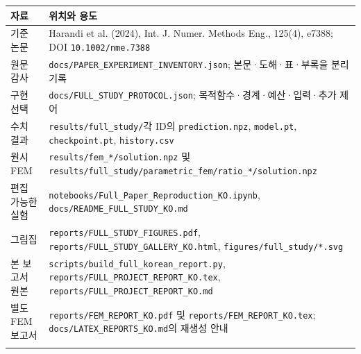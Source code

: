 \documentclass[10pt,a4paper]{article}
\begin{document}
\par\begin{minipage}{\linewidth}\begin{tabular}{>{\raggedright\arraybackslash}p{}>{\raggedright\arraybackslash}p{}}

\rowcolor{tint} \textbf{자료} & \textbf{위치와 용도}\\\midrule

기준 논문 & Harandi et al. (2024), Int. J. Numer. Methods Eng., 125(4), e7388; DOI \nolinkurl{10.1002/nme.7388}\\\addlinespace[2pt]

원문 감사 & \nolinkurl{docs/PAPER_EXPERIMENT_INVENTORY.json}; 본문·도해·표·부록을 분리 기록\\\addlinespace[2pt]

구현 선택 & \nolinkurl{docs/FULL_STUDY_PROTOCOL.json}; 목적함수·경계·예산·입력·추가 제어\\\addlinespace[2pt]

수치 결과 & \nolinkurl{results/full_study/}각 ID의 \nolinkurl{prediction.npz}, \nolinkurl{model.pt}, \nolinkurl{checkpoint.pt}, \nolinkurl{history.csv}\\\addlinespace[2pt]

원시 FEM & \nolinkurl{results/fem_*/solution.npz} 및 \nolinkurl{results/full_study/parametric_fem/ratio_*/solution.npz}\\\addlinespace[2pt]

편집 가능한 실험 & \nolinkurl{notebooks/Full_Paper_Reproduction_KO.ipynb}, \nolinkurl{docs/README_FULL_STUDY_KO.md}\\\addlinespace[2pt]

그림집 & \nolinkurl{reports/FULL_STUDY_FIGURES.pdf}, \nolinkurl{reports/FULL_STUDY_GALLERY_KO.html}, \nolinkurl{figures/full_study/*.svg}\\\addlinespace[2pt]

본 보고서 원본 & \nolinkurl{scripts/build_full_korean_report.py}, \nolinkurl{reports/FULL_PROJECT_REPORT_KO.tex}, \nolinkurl{reports/FULL_PROJECT_REPORT_KO.md}\\\addlinespace[2pt]

별도 FEM 보고서 & \nolinkurl{reports/FEM_REPORT_KO.pdf} 및 \nolinkurl{reports/FEM_REPORT_KO.tex}; \nolinkurl{docs/LATEX_REPORTS_KO.md}의 재생성 안내\\\addlinespace[2pt]

\bottomrule\end{tabular}\end{minipage}\par\vspace{5pt}\endgroup
\end{document}
